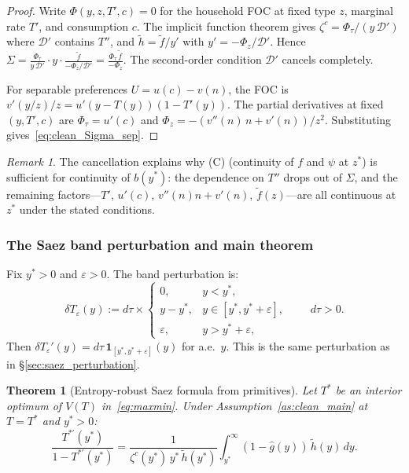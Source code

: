 \documentclass[12pt,a4paper]{article}
\theoremstyle{definition}
\theoremstyle{plain}
\newtheorem{theorem}{Theorem}[section]
\theoremstyle{remark}
\newtheorem{remark}{Remark}[section]
\begin{document}
\begin{proof}
Write $\Phi(y,z,T',c) = 0$ for the household FOC at fixed type $z$, marginal rate $T'$, and consumption $c$.  The implicit function theorem gives $\zeta^c = \Phi_\tau/(y\,\mathcal{D}')$ where $\mathcal{D}'$ contains $T''$, and $\widetilde{h} = \widetilde{f}/y'$ with $y' = -\Phi_z/\mathcal{D}'$.  Hence $\Sigma = \frac{\Phi_\tau}{y\,\mathcal{D}'}\cdot y\cdot\frac{\widetilde{f}}{-\Phi_z/\mathcal{D}'} = \frac{\Phi_\tau\,\widetilde{f}}{-\Phi_z}$.  The second-order condition $\mathcal{D}'$ cancels completely.

For separable preferences $U = u(c) - v(n)$, the FOC is $v'(y/z)/z = u'(y-T(y))(1-T'(y))$.  The partial derivatives at fixed $(y,T',c)$ are $\Phi_\tau = u'(c)$ and $\Phi_z = -(v''(n)\,n+v'(n))/z^2$.  Substituting gives~\eqref{eq:clean_Sigma_sep}.
\end{proof}

\begin{remark}
The cancellation explains why \textup{(C)} (continuity of $f$ and $\psi$ at $z^*$) is sufficient for continuity of $b(y^*)$: the dependence on $T''$ drops out of $\Sigma$, and the remaining factors---$T'$, $u'(c)$, $v''(n)n + v'(n)$, $\widetilde{f}(z)$---are all continuous at $z^*$ under the stated conditions.
\end{remark}


\subsubsection{The Saez band perturbation and main theorem}

Fix $y^* > 0$ and $\varepsilon > 0$.  The band perturbation is:
\begin{equation}
\label{eq:clean_band}
  \delta T_\varepsilon(y) := d\tau \times
  \begin{cases}
    0, & y < y^*, \\
    y - y^*, & y \in [y^*,y^*+\varepsilon], \\
    \varepsilon, & y > y^*+\varepsilon,
  \end{cases}
  \qquad d\tau > 0.
\end{equation}
Then $\delta T_\varepsilon'(y) = d\tau\,\mathbf{1}_{[y^*,y^*+\varepsilon]}(y)$ for a.e.\ $y$.  This is the same perturbation as in \S\ref{sec:saez_perturbation}.

\begin{theorem}[Entropy-robust Saez formula from primitives]
\label{thm:clean_main}
Let $T^*$ be an interior optimum of $V(T)$ in~\eqref{eq:maxmin}.  Under Assumption~\ref{as:clean_main} at $T = T^*$ and $y^* > 0$:
\begin{equation}
\label{eq:clean_saez}
  \boxed{
  \frac{T^{*\prime}(y^*)}{1 - T^{*\prime}(y^*)}
  =
  \frac{1}{\zeta^c(y^*)\,y^*\,\widetilde{h}(y^*)}
  \int_{y^*}^\infty (1-\hat g(y))\,\widetilde{h}(y)\,dy.
  }
\end{equation}
\end{theorem}
\end{document}
